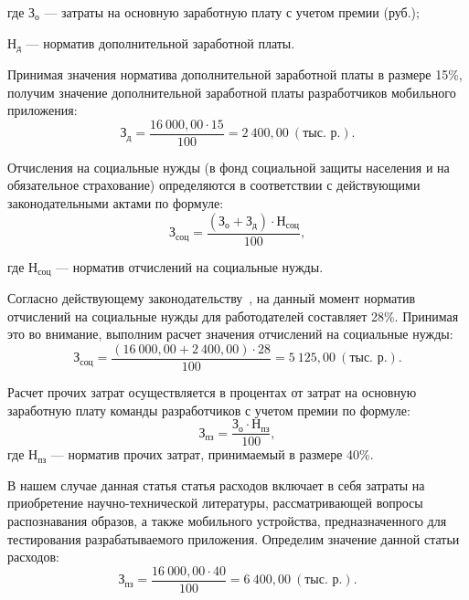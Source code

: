 \noindent где
\( \text{З}_{\text{о}} \)
--- затраты на основную заработную плату с учетом премии (руб.); \par
\noindent \hspace{6.5mm} \( \text{Н}_{\text{д}} \)
--- норматив дополнительной заработной платы.

Принимая значения норматива дополнительной заработной платы в размере 15\%,
получим значение дополнительной заработной платы разработчиков
мобильного приложения:
\begin{equation*}
  \text{З}_{\text{д}} =
  \dfrac{16 \: 000{,}00 \cdot 15}{100} = 2 \: 400{,}00 \: (\text{тыс.~р.}).
\end{equation*}

Отчисления на социальные нужды (в фонд социальной защиты
населения и на обязательное страхование) определяются в соответствии с
действующими законодательными актами по формуле:
\begin{equation*}
  \text{З}_{\text{соц}} =
  \dfrac{(\text{З}_{\text{о}} + \text{З}_{\text{д}}) \cdot \text{Н}_{\text{соц}}}{100},
\end{equation*}

\noindent где
\( \text{Н}_{\text{соц}} \)
--- норматив отчислений на социальные нужды.

Согласно действующему законодательству~\cite{law_social_royalties},
на данный момент норматив отчислений на социальные нужды для работодателей
составляет 28\%. Принимая это во внимание, выполним расчет значения
отчислений на социальные нужды:
\begin{equation*}
  \text{З}_{\text{соц}} =
  \dfrac{(16 \: 000{,}00 + 2 \: 400{,}00) \cdot 28}{100} = 5 \: 125{,}00 \: (\text{тыс.~р.}).
\end{equation*}

Расчет прочих затрат осуществляется в процентах от затрат на основную
заработную плату команды разработчиков с учетом премии по формуле:
\begin{equation*}
  \text{З}_{\text{пз}} =
  \dfrac{\text{З}_{\text{о}} \cdot \text{Н}_{\text{пз}}}{100},
\end{equation*}
\noindent где
\( \text{Н}_{\text{пз}} \)
--- норматив прочих затрат, принимаемый в размере 40\%.

В нашем случае данная статья статья расходов включает в себя затраты на приобретение
научно-технической литературы, рассматривающей вопросы распознавания образов,
а также мобильного устройства, предназначенного
для тестирования разрабатываемого приложения.
Определим значение данной статьи расходов:
\begin{equation*}
  \text{З}_{\text{пз}} =
  \dfrac{16 \: 000{,}00 \cdot 40}{100} = 6 \: 400{,}00 \: (\text{тыс.~р.}).
\end{equation*}

